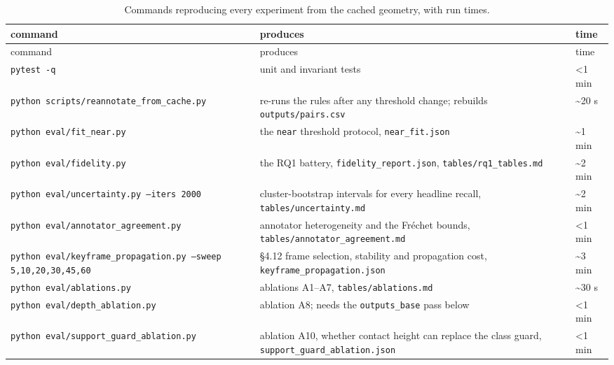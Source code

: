 \begin{center}
\setlength{\tabcolsep}{3pt}
\footnotesize
\begin{longtable}{>{\raggedright\arraybackslash}p{}>{\raggedright\arraybackslash}p{}>{\raggedright\arraybackslash}p{}}
\caption[Commands reproducing every experiment from the cached]{Commands reproducing every experiment from the cached geometry, with run times.}\\
\hline
command & produces & time \\
\hline
\endfirsthead
\hline
command & produces & time \\
\hline
\endhead
\texttt{pytest -q} & 66 unit and invariant tests & <1 min \\
\texttt{python scripts/reannotate\_\allowbreak{}from\_\allowbreak{}cache.py} & re-runs the rules after any threshold change; rebuilds \texttt{outputs/pairs.csv} & \textasciitilde{}20 s \\
\texttt{python eval/fit\_\allowbreak{}near.py} & the \texttt{near} threshold protocol, \texttt{near\_\allowbreak{}fit.json} & \textasciitilde{}1 min \\
\texttt{python eval/fidelity.py} & the RQ1 battery, \texttt{fidelity\_\allowbreak{}report.json}, \texttt{tables/rq1\_\allowbreak{}tables.md} & \textasciitilde{}2 min \\
\texttt{python eval/uncertainty.py --iters 2000} & cluster-bootstrap intervals for every headline recall, \texttt{tables/uncertainty.md} & \textasciitilde{}2 min \\
\texttt{python eval/annotator\_\allowbreak{}agreement.py} & annotator heterogeneity and the Fréchet bounds, \texttt{tables/annotator\_\allowbreak{}agreement.md} & <1 min \\
\texttt{python eval/keyframe\_\allowbreak{}propagation.py --sweep 5,10,20,30,45,60} & \S{}4.12 frame selection, stability and propagation cost, \texttt{keyframe\_\allowbreak{}propagation.json} & \textasciitilde{}3 min \\
\texttt{python eval/ablations.py} & ablations A1--A7, \texttt{tables/ablations.md} & \textasciitilde{}30 s \\
\texttt{python eval/depth\_\allowbreak{}ablation.py} & ablation A8; needs the \texttt{outputs\_\allowbreak{}base} pass below & <1 min \\
\texttt{python eval/support\_\allowbreak{}guard\_\allowbreak{}ablation.py} & ablation A10, whether contact height can replace the class guard, \texttt{support\_\allowbreak{}guard\_\allowbreak{}ablation.json} & <1 min \\

\end{longtable}
\end{center}
